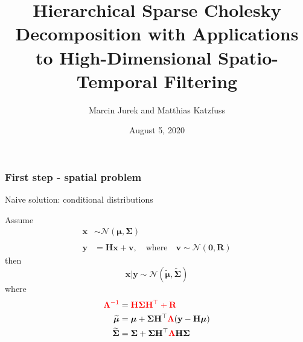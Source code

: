 \documentclass[usenames,dvipsnames,svgnames,table]{beamer}
\title[Sparse Cholesky]{Hierarchical Sparse Cholesky Decomposition with Applications to High-Dimensional Spatio-Temporal Filtering} %
\author[Jurek \& Katzfuss]{Marcin Jurek and Matthias Katzfuss } %
\institute[Texas A\&M] %
{
Texas A\&M University \\ %
\medskip
}
\date{August 5, 2020} %
\newcommand{\bv}{\mathbf{v}}
\newcommand{\bx}{\mathbf{x}}
\newcommand{\by}{\mathbf{y}}
\newcommand{\bH}{\mathbf{H}}
\newcommand{\bR}{\mathbf{R}}
\newcommand{\bfzero}{\mathbf{0}}
\newcommand{\bfmu}{\bm{\mu}}
\newcommand{\bfSigma}{\bm{\Sigma}}
\newcommand{\bfLambda}{\bm{\Lambda}}
\newcommand{\normal}{\mathcal{N}}
\begin{document}
\begin{frame}
\titlepage %
\end{frame}




%
%




\begin{frame}
	\frametitle{First step - spatial problem}
	Naive solution: conditional distributions
	
	Assume 
	\begin{align*}	
	\bx &\sim \normal(\bfmu, \bfSigma)\\ 
	\\
	\by &= \bH\bx + \bv, \quad \text{where} \quad \bv \sim \normal(\bfzero, \bR)
	\end{align*}\pause
	then	
	$$\bx | \by\sim \normal(\widetilde{\bfmu}, \widetilde{\bfSigma})$$\pause
	where 
	\begin{align*}
		{\color{red} \bfLambda^{-1}} &= {\color{red}\bH\bfSigma\bH^\top + \bR  }\\
		\widetilde{\bfmu} &= \bfmu +  \bfSigma\bH^\top {\color{red}\bfLambda} (\by - \bH\bfmu)\\
		\widetilde{\bfSigma} &= \bfSigma +  \bfSigma\bH^\top {\color{red}\bfLambda} \bH\bfSigma
	\end{align*}
	
\end{frame}
\end{document}
